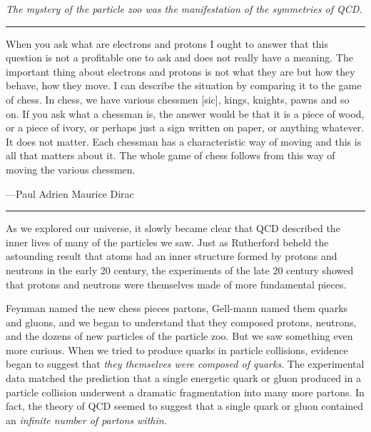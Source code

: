 \textit{The mystery of the particle zoo was the manifestation of the symmetries of QCD.}


\vspace{1.5cm}
\hrule
\begingroup

\setlength \epigraphwidth {\textwidth}
\setlength \epigraphrule {0pt}
\renewcommand {\epigraphflush} {center}
\renewcommand {\sourceflush} {center}

\epigraph{
        When you ask what are electrons and protons I ought to answer that this question is not a profitable one to ask and does not really have a meaning.
    The important thing about electrons and protons is not what they are but how they behave, how they move.
    I can describe the situation by comparing it to the game of chess.
    In chess, we have various chessmen [sic], kings, knights, pawns and so on.
    If you ask what a chessman is, the answer would be that it is a piece of wood, or a piece of ivory, or perhaps just a sign written on paper, or anything whatever.
    It does not matter.
    Each chessman has a characteristic way of moving and this is all that matters about it.
    The whole game of chess follows from this way of moving the various chessmen.
}{---Paul Adrien Maurice Dirac}

\endgroup

\vspace{0.2cm}
\hrule
\vspace{1.5cm}


As we explored our universe, it slowly became clear that QCD described the inner lives of many of the particles we saw.
%
Just as Rutherford beheld the astounding result that atoms had an inner structure formed by protons and neutrons in the early 20\th{} century, the experiments of the late 20\th{} century showed that protons and neutrons were themselves made of more fundamental pieces.

Feynman named the new chess pieces partons, Gell-mann named them quarks and gluons, and we began to understand that they composed protons, neutrons, and the dozens of new particles of the particle zoo.
%
But we saw something even more curious.
%
When we tried to produce quarks in particle collisions, evidence began to suggest that \textit{they themselves were composed of quarks}.
%
The experimental data matched the prediction that a single energetic quark or gluon produced in a particle collision underwent a dramatic fragmentation into many more partons.
%
In fact, the theory of QCD seemed to suggest that a single quark or gluon contained an \textit{infinite number of partons within}.

